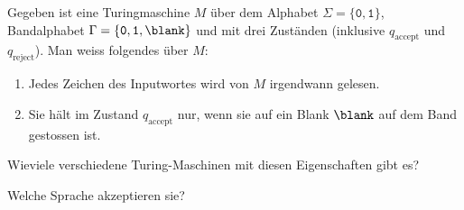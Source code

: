 Gegeben ist eine Turingmaschine $M$ über dem Alphabet
$\Sigma=\{\texttt{0}, \texttt{1}\}$,
Bandalphabet
$\Gamma=\{\texttt{0}, \texttt{1}, \blank\}$
und mit drei Zuständen
(inklusive $q_{\text{accept}}$ und $q_{\text{reject}}$).
Man weiss folgendes über $M$:
\begin{enumerate}
\item\label{50000019:liestalles} Jedes Zeichen des Inputwortes wird
von $M$ irgendwann gelesen.
\item\label{50000019:haeltaufblank} Sie hält im Zustand $q_{\text{accept}}$
nur, wenn sie auf ein Blank $\blank$ auf dem Band gestossen ist.
\end{enumerate}
\begin{teilaufgaben}
\item
Wieviele verschiedene Turing-Maschinen mit diesen Eigenschaften gibt es?
\item
Welche Sprache akzeptieren sie?
\end{teilaufgaben}


